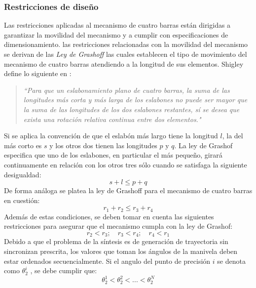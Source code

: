\subsubsection{Restricciones de diseño}\label{sec:Restricciones de diseño MEC}
Las restricciones aplicadas al mecanismo de cuatro barras están dirigidas a garantizar la movilidad del mecanismo y a cumplir con especificaciones de dimensionamiento. las restricciones relacionadas con la movilidad del mecanismo se derivan de las \textit{Ley de Grashoff} las cuales establecen el tipo de movimiento del mecanismo de cuatro barras atendiendo a la longitud de sus elementos. Shigley define lo siguiente en \cite{shigley1983teoria}:
\begin{quote}
\textit{``Para que un eslabonamiento plano de cuatro barras, la suma de las longitudes más corta y más larga de los eslabones no puede ser mayor que la suma de las longitudes de los dos eslabones restantes, sí se desea que exista una rotación relativa continua entre dos elementos."} 
\end{quote}
Si se aplica la convención de que el eslabón más largo tiene la longitud $l$, la del más corto es $s$ y los otros dos tienen las longitudes $p$ y $q$. La ley de Grashof especifica que uno de los eslabones, en particular el más pequeño, girará continuamente en relación con los otros tres sólo cuando se satisfaga la siguiente desigualdad:
\begin{equation}
s+l \leq p+q
\end{equation}
De forma análoga se platea la ley de Grashoff para el mecanismo de cuatro barras en cuestión:
\begin{equation}
r_1+r_2 \leq r_3+r_4
\end{equation}
Además de estas condiciones, se deben tomar en cuenta las siguientes restricciones  para asegurar que el mecanismo cumpla con la ley de Grashof:
\begin{equation}
r_2 < r_3;\quad r_3 < r_4;\quad r_4 < r_1 
\end{equation}
Debido a que el problema de la síntesis es de generación de trayectoria sin sincronizan prescrita, los valores que toman los ángulos de la manivela deben estar ordenados secuencialmente. Si el angulo
del punto de precisión $i$ se denota como $\theta^i_2$ , se debe cumplir que:
\begin{equation}
\theta^1_2 < \theta^2_2< ... < \theta^N_2
\end{equation}
